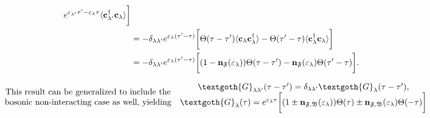 \begin{equation}
\begin{split}
    e^{\varepsilon_{\lambda'} \tau' - \varepsilon_{\lambda} \tau} \langle {\bf c}_{\lambda'}^\dagger {\bf c}_{\lambda} \rangle
    \bigg] \\
    &= - \delta_{\lambda \lambda'} e^{\varepsilon_{\lambda} (\tau'-\tau)}
    \bigg[
    \Theta(\tau - \tau') 
    \langle {\bf c}_{\lambda} {\bf c}_{\lambda}^\dagger \rangle
    - \Theta(\tau' - \tau) 
     \langle {\bf c}_{\lambda}^\dagger {\bf c}_{\lambda} \rangle
    \bigg] \\
    &= - \delta_{\lambda \lambda'} e^{\varepsilon_{\lambda} (\tau'-\tau)}
    \bigg[ (1 - {\bf n}_{\mathfrak{F}}(\varepsilon_{\lambda}))
    \Theta(\tau - \tau') 
    - {\bf n}_{\mathfrak{F}}(\varepsilon_{\lambda}) \Theta(\tau' - \tau) 
    \bigg].
    \end{split} \label{Matsubara_Green_Non_interacting_fermion_Matsubara_function}
\end{equation}

\begin{equation}
    \begin{array}{cc}
         \textnormal{This result can be generalized to include the}  \\
         \textnormal{bosonic non-interacting case as well, yielding}
    \end{array} 
    \begin{array}{cc}
         \textgoth{G}_{\lambda \lambda'}(\tau - \tau') = \delta_{\lambda \lambda'} \textgoth{G}_{\lambda}(\tau - \tau'), \\
         \textgoth{G}_{\lambda}(\tau) = e^{\varepsilon_{\lambda} \tau}
    \bigg[ (1 \pm {\bf n}_{\mathfrak{F}, \mathfrak{B}}(\varepsilon_{\lambda}))
    \Theta(\tau) 
    \pm {\bf n}_{\mathfrak{F}, \mathfrak{B}}(\varepsilon_{\lambda}) \Theta(- \tau) 
    \bigg]
    \end{array}
\end{equation}

